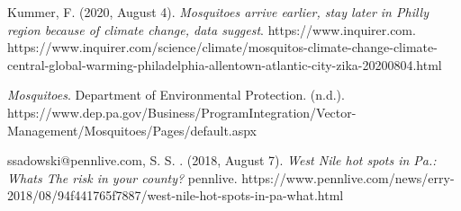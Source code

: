 \documentclass[
  letterpaper,
  DIV=11,
  numbers=noendperiod]{scrartcl}
\begin{document}
Kummer, F. (2020, August 4). \emph{Mosquitoes arrive earlier, stay later
in Philly region because of climate change, data suggest}.
https://www.inquirer.com.
https://www.inquirer.com/science/climate/mosquitos-climate-change-climate-central-global-warming-philadelphia-allentown-atlantic-city-zika-20200804.html

\emph{Mosquitoes}. Department of Environmental Protection. (n.d.).
https://www.dep.pa.gov/Business/ProgramIntegration/Vector-Management/Mosquitoes/Pages/default.aspx

ssadowski@pennlive.com, S. S. \textbar. (2018, August 7). \emph{West
Nile hot spots in Pa.: What\textquotesingle s The risk in your county?}
pennlive.
https://www.pennlive.com/news/erry-2018/08/94f441765f7887/west-nile-hot-spots-in-pa-what.html
\end{document}
